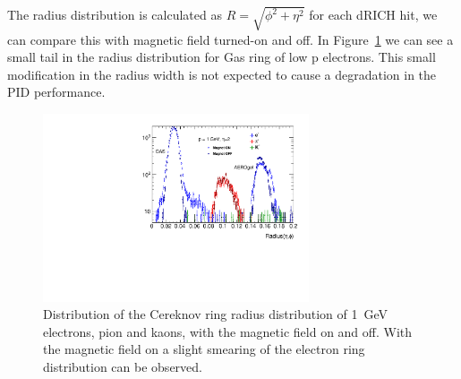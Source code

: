 The radius distribution is calculated as $R=\sqrt{\phi^{2}+\eta^{2}}$ for each dRICH hit, we can compare this with magnetic field turned-on and off. In Figure~\ref{fig:drich_radius_p1_ePiK} we can see a small tail in the radius distribution for Gas ring of low p electrons. This small modification in the radius width is not expected to cause a degradation in the PID performance.
\begin{figure}[h!tbp]
    \centering
    \includegraphics[width=0.7\textwidth]{figs/Radius_p1_shift.pdf}
    \caption{Distribution of the Cereknov ring radius distribution of 1~GeV electrons, pion and kaons, with the magnetic field on and off.  With the magnetic field on a slight smearing of the electron ring distribution can be observed. }
    \label{fig:drich_radius_p1_ePiK}
\end{figure}